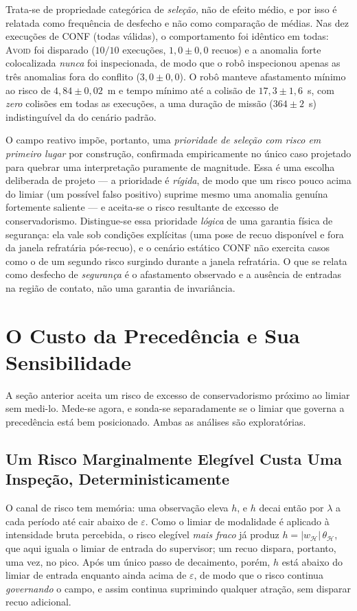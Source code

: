 Trata-se de propriedade categórica de \emph{seleção}, não de efeito médio, e por isso
é relatada como frequência de desfecho e não como comparação de médias. Nas dez
execuções de CONF (todas válidas), o comportamento foi idêntico em todas:
\textsc{Avoid} foi disparado ($10/10$ execuções, $1{,}0\pm0{,}0$ recuos) e a anomalia
forte colocalizada \emph{nunca} foi inspecionada, de modo que o robô inspecionou
apenas as três anomalias fora do conflito ($3{,}0\pm0{,}0$). O robô manteve
afastamento mínimo ao risco de $4{,}84\pm0{,}02$~m e tempo mínimo até a colisão de
$17{,}3\pm1{,}6$~s, com \emph{zero} colisões em todas as execuções, a uma duração de
missão ($364\pm2$~s) indistinguível da do cenário padrão.

O campo reativo impõe, portanto, uma \emph{prioridade de seleção com risco em
primeiro lugar} por construção, confirmada empiricamente no único caso projetado para
quebrar uma interpretação puramente de magnitude. Essa é uma escolha deliberada de
projeto --- a prioridade é \emph{rígida}, de modo que um risco pouco acima do limiar
(um possível falso positivo) suprime mesmo uma anomalia genuína fortemente saliente
--- e aceita-se o risco resultante de excesso de conservadorismo. Distingue-se essa
prioridade \emph{lógica} de uma garantia física de segurança: ela vale sob condições
explícitas (uma pose de recuo disponível e fora da janela refratária pós-recuo), e o
cenário estático CONF não exercita casos como o de um segundo risco surgindo durante
a janela refratária. O que se relata como desfecho de \emph{segurança} é o
afastamento observado e a ausência de entradas na região de contato, não uma garantia
de invariância.

\section{O Custo da Precedência e Sua Sensibilidade}
\label{sec:res-custo-precedencia}

A seção anterior aceita um risco de excesso de conservadorismo próximo ao limiar sem
medi-lo. Mede-se agora, e sonda-se separadamente se o limiar que governa a
precedência está bem posicionado. Ambas as análises são exploratórias.

\subsection{Um Risco Marginalmente Elegível Custa Uma Inspeção, Deterministicamente}

O canal de risco tem memória: uma observação eleva $h$, e $h$ decai então por
$\lambda$ a cada período até cair abaixo de $\varepsilon$. Como o limiar de
modalidade é aplicado à intensidade bruta percebida, o risco elegível \emph{mais
fraco} já produz $h=|w_{\mathcal{H}}|\,\theta_{\mathcal{H}}$, que aqui iguala o
limiar de entrada do supervisor; um recuo dispara, portanto, uma vez, no pico. Após
um único passo de decaimento, porém, $h$ está abaixo do limiar de entrada enquanto
ainda acima de $\varepsilon$, de modo que o risco continua \emph{governando} o
campo, e assim continua suprimindo qualquer atração, sem disparar recuo adicional.

